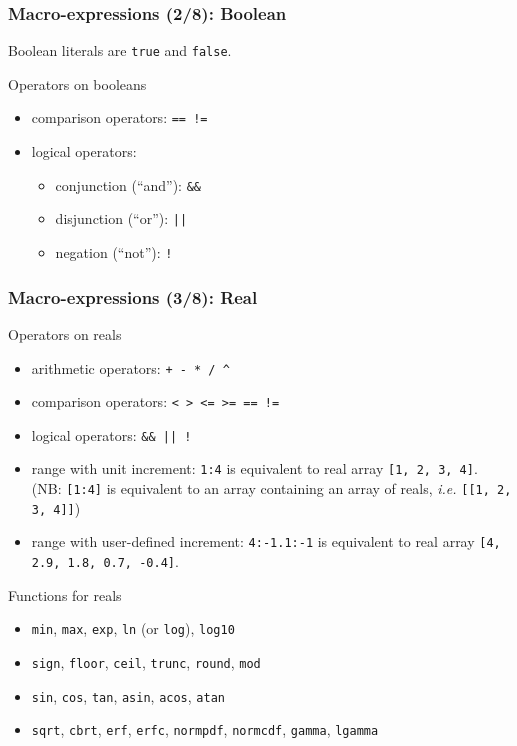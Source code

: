 \documentclass[aspectratio=169]{beamer}
\begin{document}
\begin{frame}[fragile=singleslide]
  \frametitle{Macro-expressions (2/8): Boolean}
  Boolean literals are \texttt{true} and \texttt{false}.
  \begin{block}{Operators on booleans}
    \begin{itemize}
    \item comparison operators: \texttt{== !=}
    \item logical operators:
      \begin{itemize}
      \item conjunction (“and”): \texttt{\&\&}
      \item disjunction (“or”): \texttt{||}
      \item negation (“not”): \texttt{!}
      \end{itemize}
    \end{itemize}
  \end{block}
\end{frame}

\begin{frame}[fragile=singleslide]
  \frametitle{Macro-expressions (3/8): Real}
  \begin{block}{Operators on reals}
    \begin{itemize}
    \item arithmetic operators: \texttt{+ - * / \^{}}
    \item comparison operators: \texttt{< > <= >= == !=}
    \item logical operators: \verb+&& || !+
    \item range with unit increment: \texttt{1:4} is equivalent to
      real array \texttt{[1, 2, 3, 4]}. (NB: \texttt{[1:4]} is equivalent to an
      array containing an array of reals, \textit{i.e.} \texttt{[[1, 2, 3, 4]]})
    \item range with user-defined increment: \texttt{4:-1.1:-1} is equivalent to real array \texttt{[4, 2.9, 1.8, 0.7, -0.4]}.
    \end{itemize}
  \end{block}

  \begin{block}{Functions for reals}
    \begin{itemize}
    \item \texttt{min}, \texttt{max}, \texttt{exp}, \texttt{ln} (or \texttt{log}), \texttt{log10}
    \item \texttt{sign}, \texttt{floor}, \texttt{ceil}, \texttt{trunc}, \texttt{round}, \texttt{mod}
    \item \texttt{sin}, \texttt{cos}, \texttt{tan}, \texttt{asin}, \texttt{acos}, \texttt{atan}
    \item \texttt{sqrt}, \texttt{cbrt}, \texttt{erf}, \texttt{erfc}, \texttt{normpdf}, \texttt{normcdf}, \texttt{gamma}, \texttt{lgamma}
    \end{itemize}
  \end{block}
\end{frame}
\end{document}
